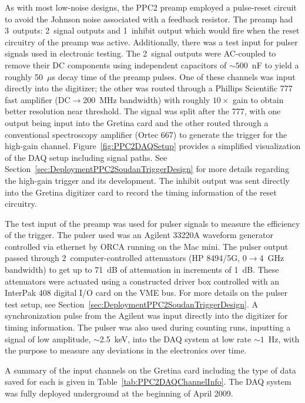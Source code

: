 	As with most low-noise designs, the PPC2 preamp employed a pulse-reset circuit to avoid the Johnson noise associated with a feedback resistor.  The preamp had 3~outputs: 2~signal outputs and 1~inhibit output which would fire when the reset circuitry of the preamp was active.  Additionally, there was a test input for pulser signals used in electronic testing.  The 2~signal outputs were AC-coupled to remove their DC components using independent capacitors of $\sim500$~nF to yield a roughly 50~$\mu$s decay time of the preamp pulses.  One of these channels was input directly into the digitizer; the other was routed through a Phillips Scientific 777 fast amplifier (DC$\to$200~MHz bandwidth) with roughly $10\times$ gain to obtain better resolution near threshold.  The signal was split after the 777, with one output being input into the Gretina card and the other routed through a conventional spectroscopy amplifier (Ortec 667) to generate the trigger for the high-gain channel.  Figure~\ref{fig:PPC2DAQSetup} provides a simplified visualization of the DAQ setup including signal paths.  See Section~\ref{sec:DeploymentPPC2SoudanTriggerDesign} for more details regarding the high-gain trigger and its development.  The inhibit output was sent directly into the Gretina digitizer card to record the timing information of the reset circuitry.
	
	The test input of the preamp was used for pulser signals to measure the efficiency of the trigger.  The pulser used was an Agilent 33220A waveform generator controlled via ethernet by ORCA running on the Mac mini.  The pulser output passed through 2~computer-controlled attenuators (HP 8494/5G, 0$\to$4~GHz bandwidth) to get up to 71~dB of attenuation in increments of 1~dB.  These attenuators were actuated using a constructed driver box controlled with an InterPak 408 digital I/O card on the VME bus.  For more details on the pulser test setup, see Section~\ref{sec:DeploymentPPC2SoudanTriggerDesign}.  A synchronization pulse from the Agilent was input directly into the digitizer for timing information.  The pulser was also used during counting runs, inputting a signal of low amplitude, $\sim$2.5~keV, into the DAQ system at low rate $\sim1$~Hz, with the purpose to measure any deviations in the electronics over time.
		     
	A summary of the input channels on the Gretina card including the type of data saved for each is given in Table~\ref{tab:PPC2DAQChannelInfo}.  
The DAQ system was fully deployed underground at the beginning of April 2009.
		 
